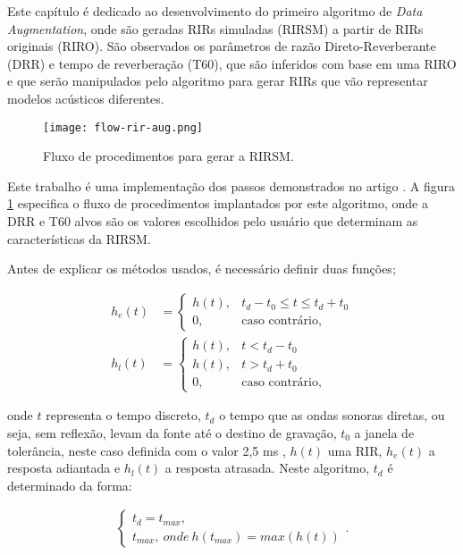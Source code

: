 Este capítulo é dedicado ao desenvolvimento do primeiro algoritmo de \textit{Data Augmentation}, onde são geradas RIRs simuladas (RIRSM)
a partir de RIRs originais (RIRO). São observados os parâmetros de razão Direto-Reverberante (DRR) e tempo de reverberação (T60), que são
inferidos com base em uma RIRO e que serão manipulados pelo algoritmo para gerar RIRs que vão representar modelos acústicos diferentes.

\begin{figure} [H]
    \centering
    \texttt{[image: flow-rir-aug.png]}
    \caption{Fluxo de procedimentos para gerar a RIRSM.}
    \label{fig:flow-rir-aug}
\end{figure}

Este trabalho é uma implementação dos passos demonstrados no artigo \cite{RIR_Data_Aug}. A figura \ref{fig:flow-rir-aug} especifica 
o fluxo de procedimentos implantados por este algoritmo, onde a DRR e T60 alvos são os valores escolhidos pelo usuário que determinam
as características da RIRSM. 

Antes de explicar os métodos usados, é necessário definir duas funções; 

\begin{align} 
    h_e(t) &= 
    \begin{cases} \label{eqn:rir-early}
        h(t), & t_d-t_0 \le t \le t_d+t_0 \\
        0, & \text{caso contrário,}
    \end{cases} \\
    h_l(t) &= 
    \begin{cases} \label{eqn:rir-late}
        h(t), & t < t_d - t_0 \\
        h(t), & t > t_d + t_0 \\
        0, & \text{caso contrário,}
    \end{cases}
\end{align}

\noindent
onde $t$ representa o tempo discreto, $t_d$ o tempo que as ondas sonoras diretas, ou seja, sem reflexão, levam da fonte até o destino de gravação,
$t_0$ a janela de tolerância, neste caso definida com o valor 2,5 ms \cite{RIR_Data_Aug}, 
$h(t)$ uma RIR, $h_e(t)$ a resposta adiantada e $h_l(t)$ a resposta atrasada.
Neste algoritmo, $t_d$ é determinado da forma:

\begin{align} \label{eqn:t_d}
    \begin{cases}
        t_d = t_{max},\\
        t_{max}, \ onde \ h(t_{max}) = max(h(t))
    \end{cases}
    .
\end{align}

